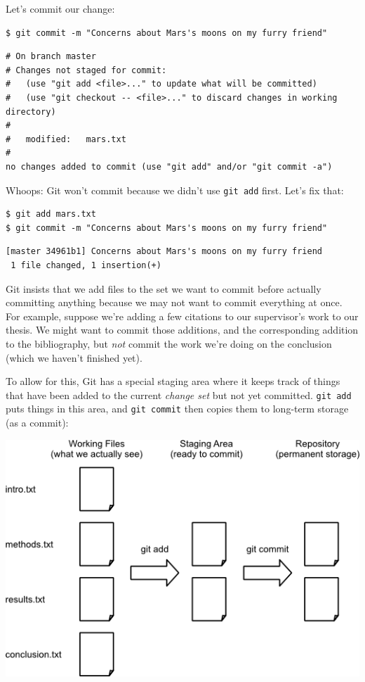 \documentclass[]{book}
\newcommand{\gdef}[2]{\emph{#2}}
\begin{document}
Let's commit our change:

\begin{verbatim}
$ git commit -m "Concerns about Mars's moons on my furry friend"
\end{verbatim}

\begin{verbatim}
# On branch master
# Changes not staged for commit:
#   (use "git add <file>..." to update what will be committed)
#   (use "git checkout -- <file>..." to discard changes in working directory)
#
#   modified:   mars.txt
#
no changes added to commit (use "git add" and/or "git commit -a")
\end{verbatim}

Whoops: Git won't commit because we didn't use \texttt{git add} first.
Let's fix that:

\begin{verbatim}
$ git add mars.txt
$ git commit -m "Concerns about Mars's moons on my furry friend"
\end{verbatim}

\begin{verbatim}
[master 34961b1] Concerns about Mars's moons on my furry friend
 1 file changed, 1 insertion(+)
\end{verbatim}

Git insists that we add files to the set we want to commit before
actually committing anything because we may not want to commit
everything at once. For example, suppose we're adding a few citations to
our supervisor's work to our thesis. We might want to commit those
additions, and the corresponding addition to the bibliography, but
\emph{not} commit the work we're doing on the conclusion (which we
haven't finished yet).

To allow for this, Git has a special staging area where it keeps track
of things that have been added to the current
\gdef{g:change-set}{change set} but not yet committed.
\texttt{git add} puts things in this area, and \texttt{git commit} then
copies them to long-term storage (as a commit):

\includegraphics{novice/git/img/git-staging-area.png}
\end{document}
